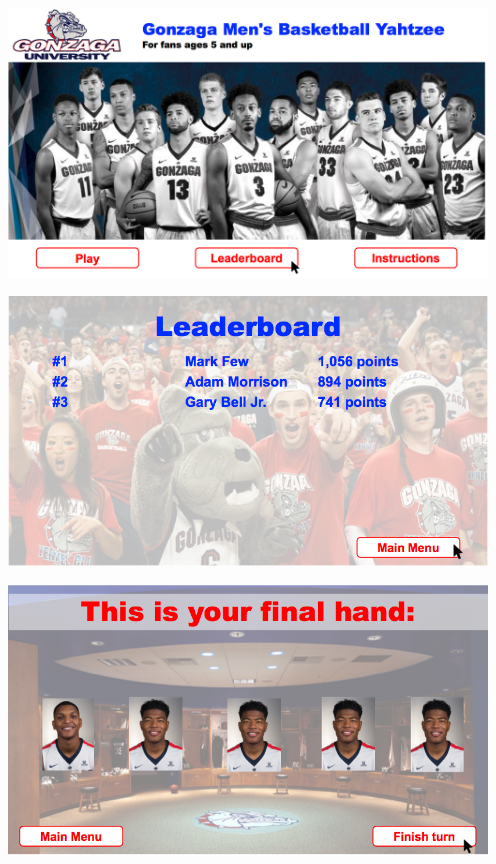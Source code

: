 \documentclass[]{report}   %
\begin{document}
\begin{center}
\includegraphics[width=5in]{Graphics/UXMockup-1.png} 
\end{center}

\begin{center}
\includegraphics[width=5in]{Graphics/UXMockup-2.png} 
\end{center}

\begin{center}
\includegraphics[width=5in]{Graphics/UXMockup-3.png} 
\end{center}
\end{document}
